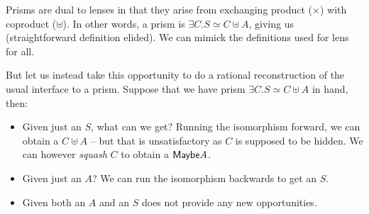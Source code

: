 \documentclass[sigplan,review,anonymous]{acmart}
\begin{document}
Prisms are dual to lenses in that they arise from exchanging product ($×$)
with coproduct ($⊎$). In other words, a prism is $∃C. S ≃ C ⊎ A$, giving us
 (straightforward definition elided). We can mimick
the definitions used for lens for all.


But let us instead take this opportunity to do a rational reconstruction of
the usual interface to a prism.  Suppose that we have prism $∃C. S ≃ C ⊎ A$
in hand, then:
\begin{itemize}
\item Given just an $S$, what can we get? Running the isomorphism
forward, we can obtain a $C ⊎ A$ -- but that is unsatisfactory as $C$ is supposed
to be hidden. We can however \emph{squash} $C$ to obtain a $\AgdaRecord{Maybe} A$.
\item Given just an $A$? We can run the isomorphism backwards to get an $S$.
\item Given both an $A$ and an $S$ does not provide any new opportunities.
\end{itemize}
\end{document}
